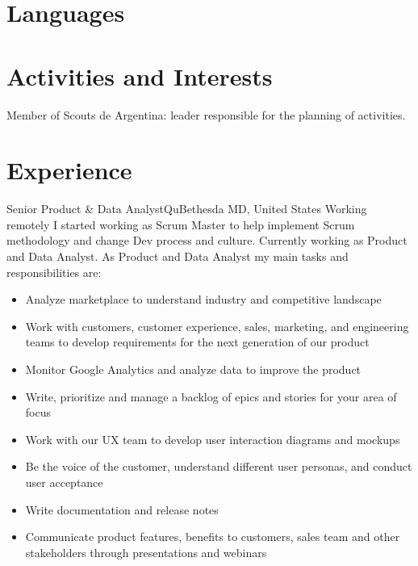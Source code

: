 \documentclass[11pt,a4paper,sans]{moderncv}
\begin{document}
\section{Languages}


\section{Activities and Interests}

Member of Scouts de Argentina: leader responsible for the planning of activities.

\section{Experience}
 {Senior Product \& Data Analyst}{Qu}{Bethesda MD, United States \- Working remotely  }{}
{
  I started working as Scrum Master to help implement Scrum methodology and change Dev process and culture. Currently working as Product and Data Analyst.
  \newline{}
}
{
  As Product and Data Analyst my main tasks and responsibilities are:
}
\begin{itemize}
  \item Analyze marketplace to understand industry and competitive landscape 
  \item Work with customers, customer experience, sales, marketing, and engineering teams to develop requirements for the next generation of our product
  \item Monitor Google Analytics and analyze data to improve the product
  \item Write, prioritize and manage a backlog of epics and stories for your area of focus
  \item Work with our UX team to develop user interaction diagrams and mockups
  \item Be the voice of the customer, understand different user personas, and conduct user acceptance 
  \item Write documentation and release notes 
  \item Communicate product features, benefits to customers, sales team and other stakeholders through presentations and webinars
\newline{}
\end{itemize}
\end{document}
